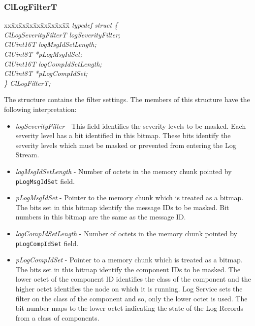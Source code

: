 \begin{flushleft}
\subsubsection{ClLogFilterT}
\begin{tabbing}
xx\=xx\=xx\=xx\=xx\=xx\=xx\=xx\=xx\=\kill
\textit{typedef struct \{}\\
\>\>\>\>\textit{ClLogSeverityFilterT	logSeverityFilter;}\\
\>\>\>\>\textit{ClUint16T			logMsgIdSetLength;}\\
\>\>\>\>\textit{ClUint8T			*pLogMsgIdSet;}\\
\>\>\>\>\textit{ClUint16T			logCompIdSetLength;}\\
\>\>\>\>\textit{ClUint8T			*pLogCompIdSet;}\\
\textit{\} ClLogFilterT;}\end{tabbing}
The structure contains the filter settings. The members of this structure have the following interpretation:
\begin{itemize}
\item
\textit{logSeverityFilter} - This field identifies the severity levels to be masked. Each severity level has a bit identified in this
bitmap. These bits identify the severity levels which must be masked or prevented from entering the Log Stream.
\item
\textit{logMsgIdSetLength} - Number of octets in the memory chunk pointed by {\tt{pLogMsgIdSet}} field.
\item
\textit{pLogMsgIdSet} - Pointer to the memory chunk which is treated as a bitmap. The bits set in this bitmap identify the message IDs to be masked. 
Bit numbers in this bitmap are the same as the message ID.
\item
\textit{logCompIdSetLength} - Number of octets in the memory chunk pointed by {\tt{pLogCompIdSet}} field.
\item
\textit{pLogCompIdSet} - Pointer to a memory chunk which is treated as a bitmap. The bits set in this bitmap identify the component IDs to be masked. 
The lower octet of the component ID identifies the class of the component and the higher octet identifies the node on which 
it is running. Log Service sets the filter on the class of the component and so, only the lower octet is used. The bit number maps to the lower
octet indicating the state of the Log Records from a class of components.
\end{itemize}	








\end{flushleft}

